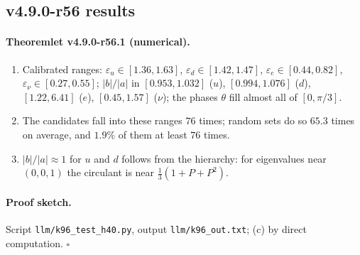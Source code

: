 \subsection*{v4.9.0-r56 results}
\label{subsec:v490-r56-results}

\paragraph{Theoremlet v4.9.0-r56.1 (numerical).}
\begin{enumerate}[leftmargin=2em]
\item[(a)] Calibrated ranges: \(\varepsilon_u\in[1.36,1.63]\), \(\varepsilon_d\in[1.42,1.47]\), \(\varepsilon_e\in[0.44,0.82]\), \(\varepsilon_\nu\in[0.27,0.55]\);
\(|b|/|a|\) in \([0.953,1.032]\) (\(u\)), \([0.994,1.076]\) (\(d\)), \([1.22,6.41]\) (\(e\)), \([0.45,1.57]\) (\(\nu\)); the phases \(\theta\) fill almost all of
\([0,\pi/3]\).
\item[(b)] The candidates fall into these ranges \(76\) times; random sets do so \(65.3\) times on average, and \(1.9\%\) of them at least \(76\) times.
\item[(c)] \(|b|/|a|\approx1\) for \(u\) and \(d\) follows from the hierarchy: for eigenvalues near \((0,0,1)\) the circulant is near \(\tfrac13(1+P+P^2)\).
\end{enumerate}

\paragraph{Proof sketch.}
Script \texttt{llm/k96\_test\_h40.py}, output \texttt{llm/k96\_out.txt}; (c) by direct computation.  \(\square\)

